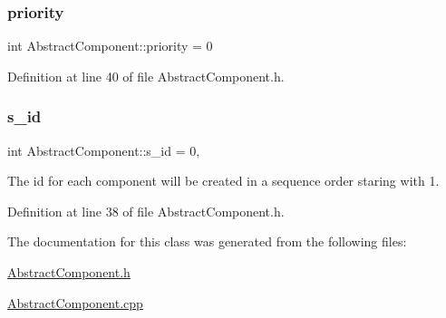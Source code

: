 \mbox{\label{class_abstract_component_aff57dfa5f31be093a06b55560e33fb95}} 
\subsubsection{\texorpdfstring{priority}{priority}}
{\footnotesize\ttfamily int Abstract\+Component\+::priority = 0\hspace{0.3cm}{\ttfamily [protected]}}



Definition at line 40 of file Abstract\+Component.\+h.

\mbox{\label{class_abstract_component_a99ce3e5fe7d73dac569b874c15fcaf0d}} 
\subsubsection{\texorpdfstring{s\+\_\+id}{s\_id}}
{\footnotesize\ttfamily int Abstract\+Component\+::s\+\_\+id = 0\hspace{0.3cm}{\ttfamily [static]}, {\ttfamily [protected]}}



The id for each component will be created in a sequence order staring with 1. 



Definition at line 38 of file Abstract\+Component.\+h.



The documentation for this class was generated from the following files\+:\begin{DoxyCompactItemize}
\item 
\hyperlink{_abstract_component_8h}{Abstract\+Component.\+h}\item 
\hyperlink{_abstract_component_8cpp}{Abstract\+Component.\+cpp}\end{DoxyCompactItemize}
